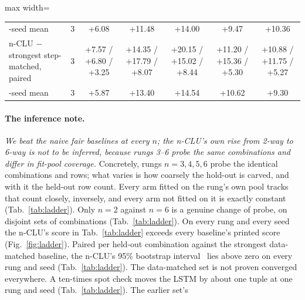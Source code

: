 \documentclass{article} %
\begin{document}
\begin{table}[t]
\begin{adjustbox}{max width=\linewidth}
\begin{tabular}{lcccccc}
\quad 3-seed mean & 3 & +6.08 & +11.48 & +14.00 & +9.47 & +10.36 \\
n-CLU $-$ strongest step-matched, paired & 3 & +7.57 / +6.80 / +3.25 & +14.35 / +17.79 / +8.07 & +20.15 / +15.02 / +8.44 & +11.20 / +15.36 / +5.30 & +10.88 / +11.75 / +5.27 \\
\quad 3-seed mean & 3 & +5.87 & +13.40 & +14.54 & +10.62 & +9.30 \\
\bottomrule
\end{tabular}\end{adjustbox}
\end{table}

\paragraph{The inference note.} \emph{We beat the naive fair baselines at
every $n$; the n-CLU's own rise from 2-way to 6-way is not to be inferred, because rungs 3--6
probe the same combinations and differ in fit-pool coverage.} Concretely,
rungs $n=3,4,5,6$ probe the identical combinations and rows; what varies is how
coarsely the hold-out is carved, and with it the held-out row count. Every arm fitted on the rung's own pool tracks that count closely,
inversely, and every arm not fitted on it is exactly constant (Tab.~\ref{tab:ladder}).
Only $n=2$ against $n=6$ is a genuine change of probe, on disjoint sets of combinations
(Tab.~\ref{tab:ladder}). %
On every rung and every seed the n-CLU's score in Tab.~\ref{tab:ladder} exceeds every baseline's
printed score (Fig.~\ref{fig:ladder}). Paired per held-out combination against the strongest data-matched baseline, the n-CLU's 95\% %
bootstrap interval~\citep{efron_bootstrap_1979} lies above zero on every rung and seed
(Tab.~\ref{tab:ladder}). %
The data-matched set is not proven converged everywhere. A ten-times spot check %
moves the LSTM by about one tuple at one rung and seed (Tab.~\ref{tab:ladder}). The earlier set's %
\end{document}
